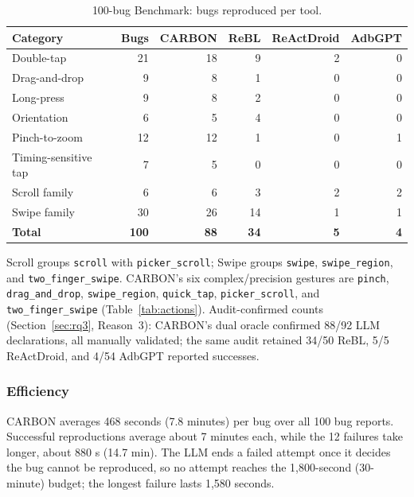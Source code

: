 \documentclass[10pt,conference,a4paper]{IEEEtran}
\begin{document}
  \begin{table}[t]
  \caption{100-bug Benchmark: bugs reproduced per tool.}
  \label{tab:bench-breakdown}
  \centering
  \scriptsize
  \setlength{\tabcolsep}{3pt}
  \renewcommand{\arraystretch}{1.25}
  \begin{tabular*}{\columnwidth}{@{\extracolsep{\fill}}lrrrrr@{}}
  \toprule
  \textbf{Category} & \textbf{Bugs} & \textbf{CARBON} & \textbf{ReBL} & \textbf{ReActDroid} & \textbf{AdbGPT} \\
  \midrule
  Double-tap           & 21 & 18 &  9 & 2 & 0 \\
  Drag-and-drop        &  9 &  8 &  1 & 0 & 0 \\
  Long-press           &  9 &  8 &  2 & 0 & 0 \\
  Orientation      &  6 &  5 &  4 & 0 & 0 \\
  Pinch-to-zoom        & 12 & 12 &  1 & 0 & 1 \\
  Timing-sensitive tap &  7 &  5 &  0 & 0 & 0 \\
  Scroll family    &  6 &  6 &  3 & 2 & 2 \\
  Swipe family     & 30 & 26 & 14 & 1 & 1 \\
  \midrule
  \textbf{Total}   & \textbf{100} & \textbf{88} & \textbf{34} & \textbf{5} & \textbf{4} \\
  \bottomrule
  \end{tabular*}

  \vspace{2pt}
  \raggedright\footnotesize
  Scroll groups \texttt{scroll} with \texttt{picker\_scroll}; Swipe groups
  \texttt{swipe}, \texttt{swipe\_region}, and \texttt{two\_finger\_swipe}.
  CARBON's six complex/precision gestures are \texttt{pinch},
  \texttt{drag\_and\_drop}, \texttt{swipe\_region}, \texttt{quick\_tap},
  \texttt{picker\_scroll}, and \texttt{two\_finger\_swipe}
  (Table~\ref{tab:actions}). Audit-confirmed counts
  (Section~\ref{sec:rq3}, Reason~3): CARBON's dual oracle confirmed 88/92
  LLM declarations, all manually validated; the same audit retained 34/50
  ReBL, 5/5 ReActDroid, and 4/54 AdbGPT reported successes.
  \end{table}

  \subsubsection{Efficiency}
  CARBON averages 468 seconds (7.8 minutes) per bug over all 100 bug
  reports. Successful reproductions average about 7 minutes each, while
  the 12 failures take longer, about 880 s (14.7 min). The LLM ends a
  failed attempt once it decides the bug cannot
  be reproduced, so no attempt reaches the 1{,}800-second (30-minute)
  budget; the longest failure lasts 1{,}580 seconds.
\end{document}
